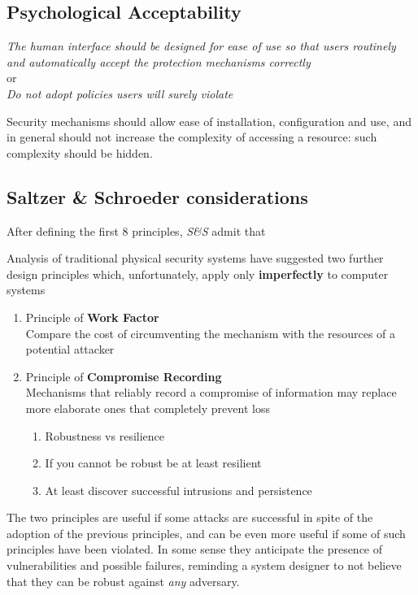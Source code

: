 \subsection{Psychological Acceptability}
\begin{center}
   \textit{The human interface should be designed for ease of use so that
   users routinely and automatically accept the protection
   mechanisms correctly}\\
   or\\
   \textit{Do not adopt policies users will surely violate}
\end{center}

Security mechanisms should allow ease of installation, configuration and use,
and in general should not increase the complexity of
accessing a resource: such complexity should be hidden.

\subsection{Saltzer \& Schroeder considerations}
After defining the first 8 principles, \textit{S\&S} admit that
\begin{center}
   Analysis of traditional physical security systems have suggested
   two further design principles which, unfortunately, apply only
   \textbf{imperfectly} to computer systems
\end{center}

\begin{enumerate}
   \item Principle of \textbf{Work Factor}\\
   Compare the cost of circumventing the mechanism with the
   resources of a potential attacker
   \item Principle of \textbf{Compromise Recording}\\
   Mechanisms that reliably record a compromise of information
   may replace more elaborate ones that completely prevent loss
   \begin{enumerate}
      \item Robustness vs resilience
      \item If you cannot be robust be at least resilient
      \item At least discover successful intrusions and persistence
   \end{enumerate}
\end{enumerate}

The two principles are useful if some attacks are
successful in spite of the adoption of the previous
principles, and can be even more useful if some of such principles have been violated.
In some sense they anticipate the presence of vulnerabilities and possible failures,
reminding a system designer to not believe that they can be robust against \textit{any} adversary.

